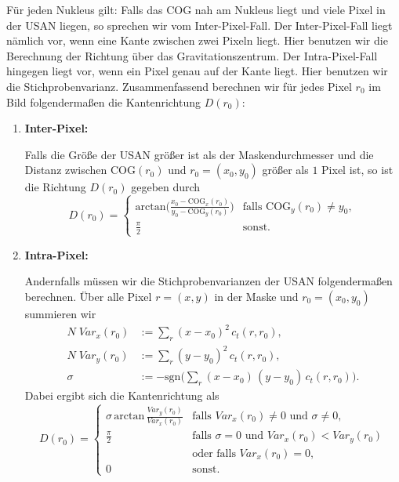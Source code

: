 \documentclass[a4paper, 11pt]{report}
\theoremstyle{definition}
\begin{document}
 			Für jeden Nukleus gilt: Falls das COG nah am Nukleus liegt und viele Pixel in der USAN liegen, so sprechen wir vom Inter-Pixel-Fall. Der Inter-Pixel-Fall liegt nämlich vor, wenn eine Kante zwischen zwei Pixeln liegt. Hier benutzen wir die Berechnung der Richtung über das Gravitationszentrum. Der Intra-Pixel-Fall hingegen liegt vor, wenn ein Pixel genau auf der Kante liegt. Hier benutzen wir die Stichprobenvarianz. Zusammenfassend berechnen wir für jedes Pixel $r_0$ im Bild folgendermaßen die Kantenrichtung $D(r_0)$:
			\begin{enumerate}
				\item \textbf{Inter-Pixel:}

				\noindent Falls die Größe der USAN größer ist als der Maskendurchmesser und die Distanz zwischen $\text{COG}(r_0)$ und $r_0=(x_0, y_0)$ größer als $1$ Pixel ist, so ist die Richtung $D(r_0)$ gegeben durch
				$$ D(r_0) = \begin{cases}
					\text{arctan}\bigg(
						\frac{x_0 - \text{COG}_x(r_0)}
						{y_0 - \text{COG}_y(r_0)}
					\bigg) & \text{falls } \text{COG}_y(r_0) \neq y_0, \\
					
					\frac{\pi}{2} & \text{sonst.}
				\end{cases} $$

				\item \textbf{Intra-Pixel:}
				
				\noindent Andernfalls müssen wir die Stichprobenvarianzen der USAN folgendermaßen berechnen. Über alle Pixel $r = (x, y)$ in der Maske und $r_0 = (x_0, y_0)$ summieren wir
				\begin{align*}
					N \; Var_x(r_0) &:= \sum_r (x-x_0)^2 \, c_t(r,r_0), \\
					N \; Var_y(r_0) &:= \sum_r (y-y_0)^2 \, c_t(r,r_0), \\
					\sigma 	&:= -\text{sgn}\bigg(\sum_r (x-x_0) \, (y-y_0) \, c_t(r,r_0)\bigg).
				\end{align*}
				Dabei ergibt sich die Kantenrichtung als
				$$ D(r_0) = \begin{cases}
						\sigma \, \text{arctan} \, \frac{Var_y(r_0)}{Var_x(r_0)} 	&	\text{falls } Var_x(r_0) \neq 0 \text{ und } \sigma \neq 0, \\
						\frac{\pi}{2}												&	\text{falls } \sigma = 0 \text{ und } Var_x(r_0) < Var_y(r_0)\\
						& \text{oder falls } Var_x(r_0) = 0,\\
						0												&	\text{sonst}.
					\end{cases}$$
			\end{enumerate}
\end{document}
